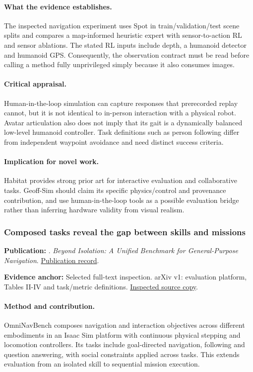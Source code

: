 \paragraph{What the evidence establishes.} The inspected navigation experiment uses Spot in train/validation/test scene splits and compares a map-informed heuristic expert with sensor-to-action RL and sensor ablations. The stated RL inputs include depth, a humanoid detector and humanoid GPS. Consequently, the observation contract must be read before calling a method fully unprivileged simply because it also consumes images.

\paragraph{Critical appraisal.} Human-in-the-loop simulation can capture responses that prerecorded replay cannot, but it is not identical to in-person interaction with a physical robot. Avatar articulation also does not imply that its gait is a dynamically balanced low-level humanoid controller. Task definitions such as person following differ from independent waypoint avoidance and need distinct success criteria.

\paragraph{Implication for novel work.} Habitat provides strong prior art for interactive evaluation and collaborative tasks. Geoff-Sim should claim its specific physics/control and provenance contribution, and use human-in-the-loop tools as a possible evaluation bridge rather than inferring hardware validity from visual realism.

\subsubsection{Composed tasks reveal the gap between skills and missions}\label{paper:omninav}
\textbf{Publication:} \citet{omninav}. \emph{Beyond Isolation: A Unified Benchmark for General-Purpose Navigation}. \href{https://arxiv.org/abs/2605.09441v1}{Publication record}.

\textbf{Evidence anchor:} Selected full-text inspection. arXiv v1: evaluation platform, Tables II-IV and task/metric definitions. \href{https://arxiv.org/pdf/2605.09441v1}{Inspected source copy}.

\paragraph{Method and contribution.} OmniNavBench composes navigation and interaction objectives across different embodiments in an Isaac Sim platform with continuous physical stepping and locomotion controllers. Its tasks include goal-directed navigation, following and question answering, with social constraints applied across tasks. This extends evaluation from an isolated skill to sequential mission execution.

